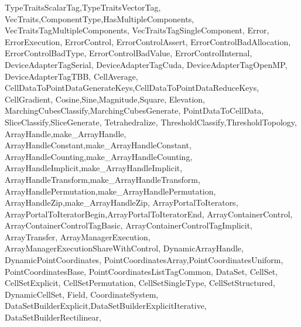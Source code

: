 {{                   TypeTraitsScalarTag,TypeTraitsVectorTag,
                   VecTraits,ComponentType,HasMultipleComponents,
                   VecTraitsTagMultipleComponents,
                   VecTraitsTagSingleComponent,
                   Error, ErrorExecution, ErrorControl,
                   ErrorControlAssert,
                   ErrorControlBadAllocation,
                   ErrorControlBadType,
                   ErrorControlBadValue,
                   ErrorControlInternal,
                   DeviceAdapterTagSerial,
                   DeviceAdapterTagCuda,
                   DeviceAdapterTagOpenMP,
                   DeviceAdapterTagTBB,
                   CellAverage,
                   CellDataToPointDataGenerateKeys,CellDataToPointDataReduceKeys,
                   CellGradient,
                   Cosine,Sine,Magnitude,Square,
                   Elevation,
                   MarchingCubesClassify,MarchingCubesGenerate,
                   PointDataToCellData,
                   SliceClassify,SliceGenerate,
                   Tetrahedralize,
                   ThresholdClassify,ThresholdTopology,
                   ArrayHandle,make_ArrayHandle,
                   ArrayHandleConstant,make_ArrayHandleConstant,
                   ArrayHandleCounting,make_ArrayHandleCounting,
                   ArrayHandleImplicit,make_ArrayHandleImplicit,
                   ArrayHandleTransform,make_ArrayHandleTransform,
                   ArrayHandlePermutation,make_ArrayHandlePermutation,
                   ArrayHandleZip,make_ArrayHandleZip,
                   ArrayPortalToIterators,
                   ArrayPortalToIteratorBegin,ArrayPortalToIteratorEnd,
                   ArrayContainerControl,
                   ArrayContainerControlTagBasic,
                   ArrayContainerControlTagImplicit,
                   ArrayTransfer,
                   ArrayManagerExecution,
                   ArrayManagerExecutionShareWithControl,
                   DynamicArrayHandle,
                   DynamicPointCoordinates,
                   PointCoordinatesArray,PointCoordinatesUniform,
                   PointCoordinatesBase,
                   PointCoordinatesListTagCommon,
                   DataSet,
                   CellSet,
                   CellSetExplicit,
                   CellSetPermutation,
                   CellSetSingleType,
                   CellSetStructured,
                   DynamicCellSet,
                   Field,
                   CoordinateSystem,
                   DataSetBuilderExplicit,DataSetBuilderExplicitIterative,
                   DataSetBuilderRectilinear,
}}

